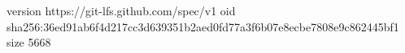 version https://git-lfs.github.com/spec/v1
oid sha256:36ed91ab6f4d217cc3d639351b2aed0fd77a3f6b07e8ecbe7808e9c862445bf1
size 5668
